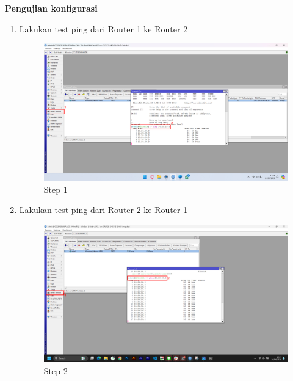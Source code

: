 \begin{center}
	\textbf{Pengujian konfigurasi}
	\begin{enumerate}
		\item Lakukan test ping dari Router 1 ke Router 2
		\begin{figure}[H]
			\centering
			\includegraphics[width=0.9\linewidth]{P1/img/per1/pc1/Step 4.png}
			\caption{Step 1}
			\label{fig:Ping Step 1(Per.1 PC1)}
		\end{figure}
		\item Lakukan test ping dari Router 2 ke Router 1
		\begin{figure}[H]
			\centering
			\includegraphics[width=0.9\linewidth]{P1/img/per1/pc2/Step 4.png}
			\caption{Step 2}
			\label{fig:Ping Step 2(Per.1 PC2)}
		\end{figure}
	\end{enumerate}
\end{center}

